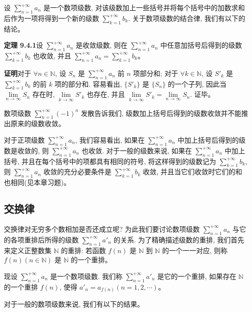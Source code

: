 \documentclass[UTF8, 12pt, fontset=fandol, oneside]{ctexart}
\begin{document}
设 $\sum\limits_{n=1}^{+\infty}a_n$ 是一个数项级数, 对该级数加上一些括号并将每个括号中的加数求和后作为一项将得到一个新的级数 $\sum\limits_{k=1}^{+\infty}b_k$. 关于数项级数的结合律, 我们有以下的结论。

\noindent\textbf{定理 9.4.1}\quad 设 $\sum\limits_{n=1}^{+\infty}a_n$ 是收敛级数, 则在 $\sum\limits_{n=1}^{+\infty}a_n$ 中任意加括号后得到的级数 $\sum\limits_{k=1}^{+\infty}b_k$ 也收敛, 并且 $\sum\limits_{n=1}^{+\infty}a_n=\sum\limits_{k=1}^{+\infty}b_k$。

\noindent\textbf{证明}\quad 对于 $\forall n\in\mathbb{N}$, 设 $S_n$ 是 $\sum\limits_{n=1}^{+\infty}a_n$ 前 $n$ 项部分和; 对于 $\forall k\in\mathbb{N}$, 设 $S'_k$ 是 $\sum\limits_{k=1}^{+\infty}b_k$ 的前 $k$ 项的部分和. 容易看出, $\{S'_k\}$ 是 $\{S_n\}$ 的一个子列, 因此当 $\lim\limits_{n\to\infty}S_n$ 存在时, $\lim\limits_{k\to\infty}S'_k$ 也存在, 并且 $\lim\limits_{k\to\infty}S'_k=\lim\limits_{n\to\infty}S_n$. 证毕。

数项级数 $\sum\limits_{n=1}^{+\infty}(-1)^n$ 发散告诉我们, 级数加上括号后得到的级数收敛并不能推出原来的级数收敛。

对于正项级数 $\sum\limits_{n=1}^{+\infty}a_n$, 我们容易看出, 如果在 $\sum\limits_{n=1}^{+\infty}a_n$ 中加上括号后得到的级数是收敛的, 则 $\sum\limits_{n=1}^{+\infty}a_n$ 也收敛. 对于一般的级数来说, 如果在 $\sum\limits_{n=1}^{+\infty}a_n$ 中加上括号, 并且在每个括号中的项都具有相同的符号, 将这样得到的级数记为 $\sum\limits_{k=1}^{+\infty}b_k$, 则 $\sum\limits_{n=1}^{+\infty}a_n$ 收敛的充分必要条件是 $\sum\limits_{k=1}^{+\infty}b_k$ 收敛, 并且当它们收敛时它们的和也相同(见本章习题)。

\subsection{交换律}

交换律对无穷多个数相加是否还成立呢? 为此我们要讨论数项级数 $\sum\limits_{n=1}^{+\infty}a_n$ 与它的各项重排后所得的级数 $\sum\limits_{n=1}^{+\infty}a'_n$ 的关系. 为了精确描述级数的重排, 我们首先来定义正整数集 $\mathbb{N}$ 的重排: 若函数 $f(n)$ 是 $\mathbb{N}$ 到 $\mathbb{N}$ 的一个一一对应, 则称 $f(n)(n\in\mathbb{N})$ 是 $\mathbb{N}$ 的一个重排。

现设 $\sum\limits_{n=1}^{+\infty}a_n$ 是一个数项级数. 我们称 $\sum\limits_{n=1}^{+\infty}a'_n$ 是它的一个重排, 如果存在 $\mathbb{N}$ 的一个重排 $f(n)$, 使得 $a'_n=a_{f(n)}(n=1,2,\cdots)$。

对于一般的数项级数来说, 我们有以下的结果。
\end{document}
